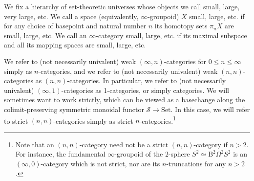 \documentclass[10pt,oneside]{article}
\numberwithin{equation}{section} %
\numberwithin{figure}{section} %
\theoremstyle{plain}
\theoremstyle{definition}
\newcommand{\mS}{{\mathcal S}}
\newcommand{\n}{{n}}
\newcommand{\Set}{\mathrm{Set}}
\begin{document}
We fix a hierarchy of set-theoretic universes whose objects we call small, large, very large, etc.
We call a space (equivalently, $\infty$-groupoid) $X$ small, large, etc. if for any choice of basepoint and natural number $n$ its homotopy sets $\pi_n X$ are small, large, etc.
We call an $\infty$-category small, large, etc. if its maximal subspace and all its mapping spaces are small, large, etc.

We refer to (not necessarily univalent) weak $(\infty,\n)$-categories for $0 \leq \n \leq \infty$ simply as $\n$-categories, and we refer to (not necessarily univalent) weak $(\n,\n)$-categories as $(\n,\n)$-categories.
In particular, we refer to (not necessarily univalent) $(\infty,1)$-categories as 1-categories, or simply categories.
We will sometimes want to work strictly, which can be viewed as a basechange along the colimit-preserving symmetric monoidal functor $\mS\to\Set$.
In this case, we will refer to strict $(\n,\n)$-categories simply as strict $\n$-categories.\footnote{Note that an $(n,n)$-category need not be a strict $(n,n)$-category if $n>2$.
For instance, the fundamental $\infty$-groupoid of the $2$-sphere $S^2\simeq \mathrm{B}^2\Omega^2 S^2$ is an $(\infty,0)$-category which is not strict, nor are its $n$-truncations for any $n>2$.}
\end{document}
